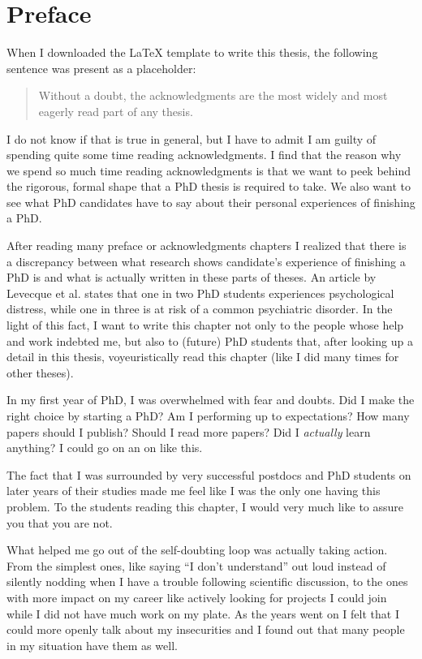 \chapter*{Preface}

When I downloaded the \LaTeX{} template to write this thesis, the following
sentence was present as a placeholder:
\begin{quote}
    Without a doubt, the acknowledgments are the most widely and most eagerly
    read part of any thesis.
\end{quote}
\noindent
I do not know if that is true in general, but I have to admit I am guilty of
spending quite some time reading acknowledgments. I find that the reason why we
spend so much time reading acknowledgments is that we want to peek behind the
rigorous, formal shape that a PhD thesis is required to take. We also want to
see what PhD candidates have to say about their personal experiences of
finishing a PhD.

After reading many preface or acknowledgments chapters I realized that there
is a discrepancy between what research shows candidate's experience of finishing
a PhD is and what is actually written in these parts of theses. An
article by Levecque et al. \cite{labhg-17-phdstudents} states that one in two
PhD students experiences psychological distress, while one in three is at risk
of a common psychiatric disorder. In the light of this fact, I want to write
this chapter not only to the people whose help and work indebted me, but also to
(future) PhD students that, after looking up a detail in this thesis,
voyeuristically read this chapter (like I did many times for other theses).

In my first year of PhD, I was overwhelmed with fear and doubts. Did I make the
right choice by starting a PhD? Am I performing up to expectations? How many
papers should I publish? Should I read more papers? Did I \emph{actually} learn
anything? I could go on an on like this.

The fact that I was surrounded by very successful postdocs and PhD students on
later years of their studies made me feel like I was the only one having this
problem. To the students reading this chapter, I would very much like to assure
you that you are not. 

What helped me go out of the self-doubting loop was actually taking action. From
the simplest ones, like saying ``I don't understand'' out loud instead of
silently nodding when I have a trouble following scientific discussion, to the
ones with more impact on my career like actively looking for projects I could
join while I did not have much work on my plate. As the years went on I felt
that I could more openly talk about my insecurities and I found out that many
people in my situation have them as well.

